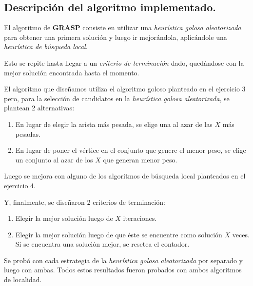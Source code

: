 \subsection{Descripción del algoritmo implementado.}
\vspace*{0.3cm}

El algoritmo de \textbf{GRASP} consiste en utilizar una
\textit{heurística golosa aleatorizada} para obtener una primera solución
y luego ir mejorándola, aplicándole una \textit{heurística de búsqueda local}.

Esto se repite hasta llegar a un \textit{criterio de terminación} dado,
quedándose con la mejor solución encontrada hasta el momento.

\vspace{0.25cm}

El algoritmo que diseñamos utiliza el algoritmo goloso planteado en el
ejercicio 3 pero, para la selección de candidatos en la \textit{heurística
golosa aleatorizada}, se plantean 2 alternativas:

\begin{enumerate}
\item En lugar de elegir la arista más pesada, se elige una al azar de las
$X$ más pesadas.

\item En lugar de poner el vértice en el conjunto que genere el menor peso,
se elige un conjunto al azar de los $X$ que generan menor peso.
\end{enumerate}

\vspace{0.25cm}

Luego se mejora con alguno de los algoritmos de búsqueda local planteados en el ejercicio 4.

Y, finalmente, se diseñaron 2 criterios de terminación:

\begin{enumerate}
\item Elegir la mejor solución luego de $X$ iteraciones.

\item Elegir la mejor solución luego de que éste se encuentre como solución $X$
veces. Si se encuentra una solución mejor, se resetea el contador.
\end{enumerate}


Se probó con cada estrategia de la \textit{heurística golosa aleatorizada} por separado y luego con ambas. Todos estos resultados fueron probados con ambos algoritmos de localidad.

